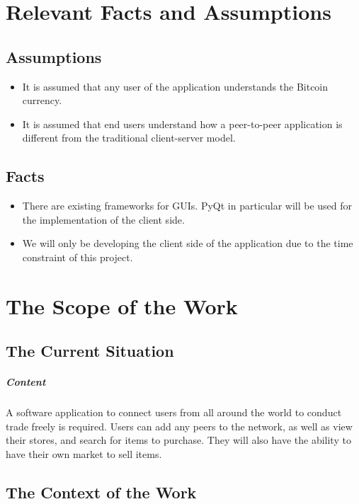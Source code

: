 \documentclass{article}
\begin{document}
\section{Relevant Facts and Assumptions}


\subsection{Assumptions}
\begin{itemize}
	
\item
It is assumed that any user of the application understands the Bitcoin currency.

\item
It is assumed that end users understand how a peer-to-peer application is different from the traditional client-server model.
\end{itemize}

\subsection{Facts}
\begin{itemize}
	
\item
There are existing frameworks for GUIs. PyQt in particular will be used for the implementation of the client side. 
\item
We will only be developing the client side of the application due to the time constraint of this project.
	
\end{itemize} 

\section{The Scope of the Work}
\subsection{The Current Situation}
\subparagraph{Content}
A software application to connect users from all around the world to conduct trade freely is required. Users can add any peers to the network, as well as view their stores, and search for items to purchase. They will also have the ability to have their own market to sell items.

\subsection{The Context of the Work}
\end{document}
